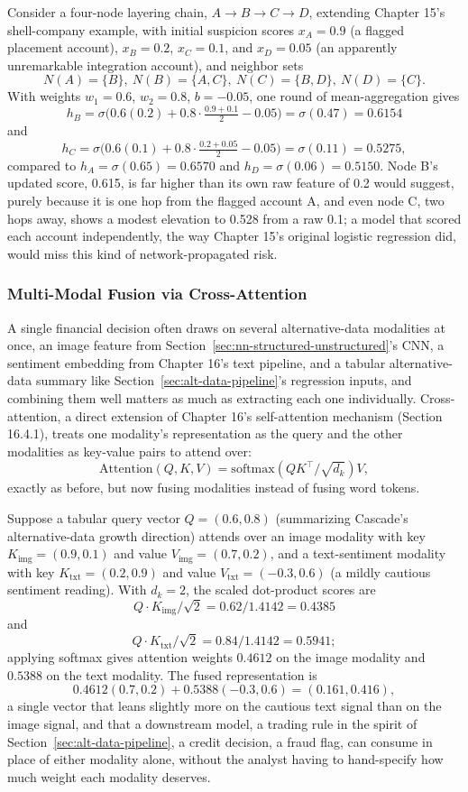 \documentclass[../ai_in_finance]{subfiles}
\begin{document}
Consider a four-node layering chain, $A \to B \to C \to D$, extending Chapter 15's shell-company example, with initial suspicion scores $x_A = 0.9$ (a flagged placement account), $x_B = 0.2$, $x_C = 0.1$, and $x_D = 0.05$ (an apparently unremarkable integration account), and neighbor sets
$$N(A)=\{B\},\ N(B)=\{A,C\},\ N(C)=\{B,D\},\  N(D)=\{C\}.$$
 With weights $w_1=0.6$, $w_2=0.8$, $b=-0.05$, one round of mean-aggregation gives
$$h_B = \sigma\big(0.6(0.2) + 0.8\cdot\tfrac{0.9+0.1}{2} - 0.05\big) = \sigma(0.47) = 0.6154$$ and
$$h_C = \sigma\big(0.6(0.1) + 0.8\cdot\tfrac{0.2+0.05}{2} - 0.05\big) = \sigma(0.11) = 0.5275,$$
compared to $h_A = \sigma(0.65) = 0.6570$ and $h_D = \sigma(0.06) = 0.5150$. Node B's updated score, 0.615, is far higher than its own raw feature of 0.2 would suggest, purely because it is one hop from the flagged account A, and even node C, two hops away, shows a modest elevation to 0.528 from a raw 0.1; a model that scored each account independently, the way Chapter 15's original logistic regression did, would miss this kind of network-propagated risk.

\subsubsection*{Multi-Modal Fusion via Cross-Attention}

A single financial decision often draws on several alternative-data modalities at once, an image feature from Section~\ref{sec:nn-structured-unstructured}'s CNN, a sentiment embedding from Chapter 16's text pipeline, and a tabular alternative-data summary like Section~\ref{sec:alt-data-pipeline}'s regression inputs, and combining them well matters as much as extracting each one individually. Cross-attention, a direct extension of Chapter 16's self-attention mechanism (Section 16.4.1), treats one modality's representation as the query and the other modalities as key-value pairs to attend over:
$$\text{Attention}(Q,K,V) = \text{softmax}(QK^\top/\sqrt{d_k})V,$$
exactly as before, but now fusing modalities instead of fusing word tokens.

Suppose a tabular query vector $Q = (0.6, 0.8)$ (summarizing Cascade's alternative-data growth direction) attends over an image modality with key $K_{\text{img}} = (0.9, 0.1)$ and value $V_{\text{img}} = (0.7, 0.2)$, and a text-sentiment modality with key $K_{\text{txt}} = (0.2, 0.9)$ and value $V_{\text{txt}} = (-0.3, 0.6)$ (a mildly cautious sentiment reading). With $d_k = 2$, the scaled dot-product scores are
$$Q \cdot K_{\text{img}}/\sqrt{2} = 0.62/1.4142 = 0.4385$$
and
$$Q \cdot K_{\text{txt}}/\sqrt{2} = 0.84/1.4142 = 0.5941;$$
applying softmax gives attention weights $0.4612$ on the image modality and $0.5388$ on the text modality. The fused representation is
$$0.4612(0.7,0.2) + 0.5388(-0.3,0.6) = (0.161, 0.416),$$
a single vector that leans slightly more on the cautious text signal than on the image signal, and that a downstream model, a trading rule in the spirit of Section~\ref{sec:alt-data-pipeline}, a credit decision, a fraud flag, can consume in place of either modality alone, without the analyst having to hand-specify how much weight each modality deserves.
\end{document}
